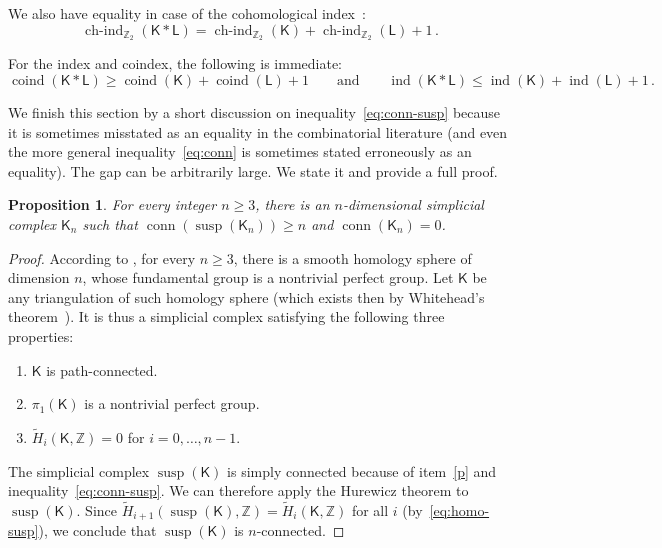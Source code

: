 \documentclass[12pt]{amsart}
\newtheorem{proposition}[theorem]{Proposition}
\theoremstyle{definition}
\def\Z{\mathbb{Z}}
\def\K{\mathsf{K}}
\def\L{\mathsf{L}}
\renewcommand{\geq}{\geqslant}
\renewcommand{\leq}{\leqslant}
\def\susp{\operatorname{susp}}
\def\conn{\operatorname{conn}}
\def\coind{\operatorname{coind}}
\def\ind{\operatorname{ind}}
\def\hind{\operatorname{ch-ind}_{\Z_2}}
\begin{document}
We also have equality in case of the cohomological index~\cite{daneshpajouh2023hedetniemi}:
\begin{equation}\label{eq:hind}
\hind(\K * \L) = \hind(\K) + \hind(\L) +1 \, .
\end{equation}

For the index and coindex, the following is immediate:
\begin{equation}\label{eq:coind}
\coind(\K * \L) \geq \coind(\K) + \coind(\L) +1 \qquad\mbox{and} \qquad \ind(\K * \L) \leq \ind(\K) + \ind(\L) +1 \, .
\end{equation}

We finish this section by a short discussion on inequality~\eqref{eq:conn-susp} because it is sometimes misstated as an equality in the combinatorial literature (and even the more general inequality~\eqref{eq:conn} is sometimes stated erroneously as an equality). The gap can be arbitrarily large. We state it and provide a full proof.

\begin{proposition}\label{prop:susp}
For every integer $n\geq 3$, there is an $n$-dimensional simplicial complex $\K_n$ such that $\conn(\susp(\K_n))\geq n$ and $\conn(\K_n) = 0$. 
\end{proposition}

\begin{proof}
According to \cite{kervaire1969smooth, ratcliffe2005some}, for every $n\geq 3$, there is a smooth homology sphere of dimension $n$, whose fundamental group is a nontrivial perfect group. Let $\K$ be any triangulation of such homology sphere (which exists then by Whitehead's theorem~\cite{whitehead1940c1}). It is thus a simplicial complex satisfying the following three properties:
\begin{enumerate}[label=(\roman*)]
\item\label{p} $\K$ is path-connected.
\item\label{pi1} $\pi_1(\K)$ is a nontrivial perfect group.
\item\label{H} $\widetilde{H}_i(\K,\Z)=0$ for $i=0,\ldots,n-1$.
\end{enumerate}
 The simplicial complex $\susp(\K)$ is simply connected because of item~\ref{p} and inequality~\eqref{eq:conn-susp}. We can therefore apply the Hurewicz theorem to $\susp(\K)$. Since $\widetilde{H}_{i+1}(\susp(\K),\Z) = \widetilde{H}_i(\K,\Z)$ for all $i$ (by~\eqref{eq:homo-susp}), we conclude that $\susp(\K)$ is $n$-connected.
\end{proof}
\end{document}
